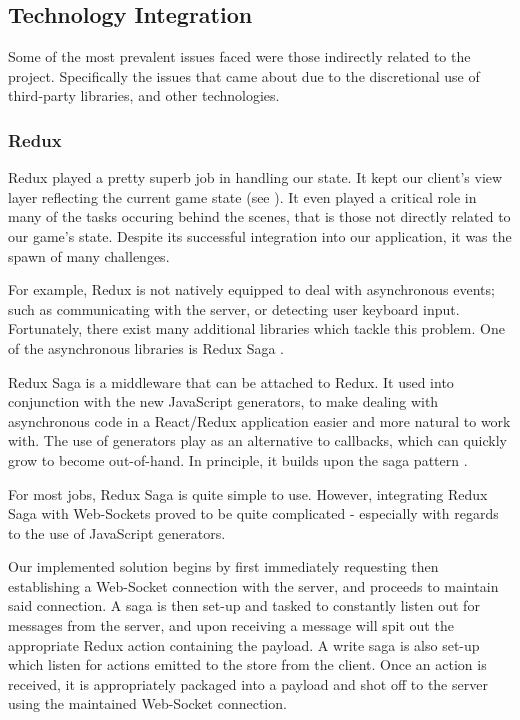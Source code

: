 \documentclass{standalone}
\begin{document}
		\subsection{Technology Integration}
			Some of the most prevalent issues faced were those indirectly related to the project. Specifically the issues that came about due to the discretional use of third-party libraries, and other technologies.

			\subsubsection{Redux} \label{sec:reduxIntegration}
				Redux played a pretty superb job in handling our state. It kept our client's view layer reflecting the current game state (see ). It even played a critical role in many of the tasks occuring behind the scenes, that is those not directly related to our game's state. Despite its successful integration into our application, it was the spawn of many challenges.

				For example, Redux is not natively equipped to deal with asynchronous events; such as communicating with the server, or detecting user keyboard input. Fortunately, there exist many additional libraries which tackle this problem. One of the asynchronous libraries is Redux Saga \parencite{reduxSaga}.

				Redux Saga is a middleware that can be attached to Redux. It used into conjunction with the new JavaScript generators, to make dealing with asynchronous code in a React/Redux application easier and more natural to work with. The use of generators play as an alternative to callbacks, which can quickly grow to become out-of-hand. In principle, it builds upon the saga pattern \parencite{sagas}.

				For most jobs, Redux Saga is quite simple to use. However, integrating Redux Saga with Web-Sockets proved to be quite complicated - especially with regards to the use of JavaScript generators.

				Our implemented solution begins by first immediately requesting then establishing a Web-Socket connection with the server, and proceeds to maintain said connection. A saga is then set-up and tasked to constantly listen out for messages from the server, and upon receiving a message will spit out the appropriate Redux action containing the payload. A write saga is also set-up which listen for actions emitted to the store from the client. Once an action is received, it is appropriately packaged into a payload and shot off to the server using the maintained Web-Socket connection.
\end{document}
